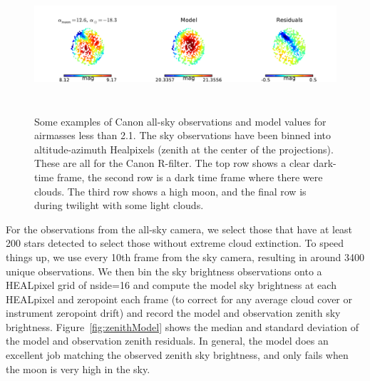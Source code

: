 \documentclass[]{spie}
\begin{document}
\begin{figure}[ht]
\begin{center}
  \includegraphics[height=5cm]{plots/exampleSkys_3.pdf}
  \end{center}
  \caption{Some examples of Canon all-sky observations and model values for airmasses less than 2.1. The sky observations have been binned into altitude-azimuth Healpixels (zenith at the center of the projections). These are all for the Canon R-filter. The top row shows a clear dark-time frame, the second row is a dark time frame where there were clouds. The third row shows a high moon, and the final row is during twilight with some light clouds. \label{fig:skyExamples}}
\end{figure}


For the observations from the all-sky camera, we select those that have at least 200 stars detected to select those without extreme cloud extinction. To speed things up, we use every 10th frame from the sky camera, resulting in around 3400 unique observations.  We then bin the sky brightness observations onto a HEALpixel grid of nside=16 and compute the model sky brightness at each HEALpixel and zeropoint each frame (to correct for any average cloud cover or instrument zeropoint drift) and record the model and observation zenith sky brightness. Figure~\ref{fig:zenithModel} shows the median and standard deviation of the model and observation zenith residuals.  In general, the model does an excellent job matching the observed zenith sky brightness, and only fails when the moon is very high in the sky.  
\end{document}
